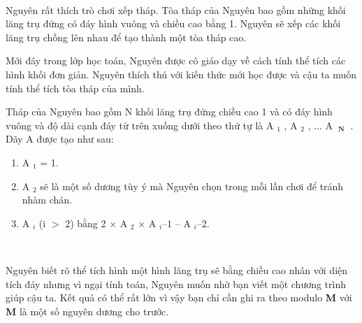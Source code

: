  

Nguyên rất thích trò chơi xếp tháp. Tòa tháp của Nguyên bao gồm những khối lăng trụ đứng có đáy hình vuông và chiều cao bằng 1. Nguyên sẽ xếp các khối lăng trụ chồng lên nhau để tạo thành một tòa tháp cao.

Mới đây trong lớp học toán, Nguyên được cô giáo dạy về cách tính thể tích các hình khối đơn giản. Nguyên thích thú với kiến thức mới học được và cậu ta muốn tính thể tích tòa tháp của mình.

Tháp của Nguyên bao gồm N khối lăng trụ đứng chiều cao 1 và có đáy hình vuông và độ dài cạnh đáy từ trên xuống dưới theo thứ tự là A $_ 1 $ , A­­­ $_ 2 $ , ... A­­ $_\textbf{ N }$ . Dãy A được tạo như sau:
\begin{enumerate}
	\item A $_ 1 $ = 1.
	\item A $_ 2 $ sẽ là một số dương tùy ý mà Nguyên chọn trong mỗi lần chơi để tránh nhàm chán.
	\item A $_ i $ (i $>$ 2) bằng 2 × A $_ 2 $ × A $_ i  – 1 $ – A­ $_ i – 2. $
\end{enumerate}

 

Nguyên biết rõ thể tích hình một hình lăng trụ sẽ bằng chiều cao nhân với diện tích đáy nhưng vì ngại tính toán, Nguyên muốn nhờ bạn viết một chương trình giúp cậu ta. Kết quả có thể rất lớn vì vậy bạn chỉ cần ghi ra theo modulo \textbf{ M } với \textbf{ M } là một số nguyên dương cho trước.

\